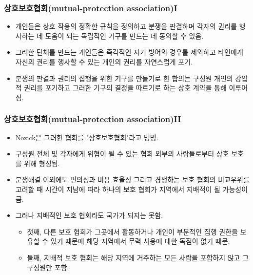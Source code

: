 \documentclass[aspectratio=169,xcolor=dvipsnames,handout]{beamer}
\begin{document}
\begin{frame}[<+->]
\frametitle{상호보호협회(mutual-protection association)I}
    \begin{itemize}
       \item 개인들은 상호 작용의 정확한 규칙을 정의하고 분쟁을 판결하며 각자의 권리를 행사하는 데 도움이 되는 독립적인 기구를 만드는 데 동의할 수 있음.
       \item  그러한 단체를 만드는 개인들은 즉각적인 자기 방어의 경우를 제외하고 타인에게 자신의 권리를 행사할 수 있는 개인의 권리를 자연스럽게 포기.
       \item  분쟁의 판결과 권리의 집행을 위한 기구를 만들기로 한 합의는 구성원 개인의 강압적 권리를 포기하고 그러한 기구의 결정을 따르기로 하는 상호 계약을 통해 이루어짐.
    \end{itemize}
\end{frame}

\begin{frame}[<+->]
\frametitle{상호보호협회(mutual-protection association)II}
    \begin{itemize}
       \item Nozick은 그러한 협회를 "상호보호협회"라고 명명. 
       \item 구성원 전체 및 각자에게 위협이 될 수 있는 협회 외부의 사람들로부터 상호 보호를 위해 형성됨.
       \item 분쟁해결 이외에도 편의성과 비용 효율성 그리고 경쟁하는 보호 협회의 비교우위를 고려할 때 시간이 지남에 따라 하나의 보호 협회가 지역에서 지배적이 될 가능성이 큼.
       \item  그러나 지배적인 보호 협회라도 국가가 되지는 못함.
        \begin{itemize}
           \item 첫째, 다른 보호 협회가 그곳에서 활동하거나 개인이 부분적인 집행 권한을 보유할 수 있기 때문에 해당 지역에서 무력 사용에 대한 독점이 없기 때문.
           \item 둘째, 지배적 보호 협회는 해당 지역에 거주하는 모든 사람을 포함하지 않고 그 구성원만 포함.
        \end{itemize}
    \end{itemize}
\end{frame}
\end{document}
